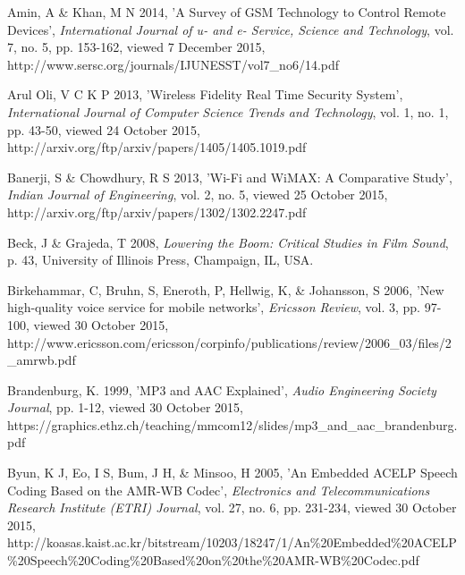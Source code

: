 \documentclass[12pt,svgnames,smaller]{article} %
\begin{document}
	\begin{thebibliography}{ 10 }
		
		
		Amin, A \& Khan, M N 2014, 'A Survey of GSM Technology to Control Remote Devices', \emph{International Journal of u- and e- Service, Science and Technology}, vol. 7, no. 5, pp. 153-162, viewed 7 December 2015, http://www.sersc.org/journals/IJUNESST/vol7\_no6/14.pdf
		
		
		Arul Oli, V C K P 2013, 'Wireless Fidelity Real Time Security System', \emph{International Journal of Computer Science Trends and Technology},	vol. 1, no. 1, pp. 43-50, viewed 24 October 2015, http://arxiv.org/ftp/arxiv/papers/1405/1405.1019.pdf
		
		
		Banerji, S \& Chowdhury, R S 2013, 'Wi-Fi and WiMAX: A Comparative Study', \emph{Indian Journal of Engineering}, vol. 2, no. 5, viewed 25 October 2015, http://arxiv.org/ftp/arxiv/papers/1302/1302.2247.pdf 
		
		
		Beck, J \& Grajeda, T 2008,
		\emph{Lowering the Boom: Critical Studies in Film Sound}, p. 43, University of Illinois Press, Champaign, IL, USA. 
		
		
		Birkehammar, C, Bruhn, S, Eneroth, P, Hellwig, K, \& Johansson, S 2006, 'New high-quality voice service for mobile networks', \emph{Ericsson Review}, vol. 3, pp. 97-100, viewed 30 October 2015, http://www.ericsson.com/ericsson/corpinfo/publications/review/2006\_03/files/2\_amrwb.pdf
		
		
		Brandenburg, K. 1999, 'MP3 and AAC Explained', \emph{Audio Engineering Society Journal}, pp. 1-12, viewed 30 October 2015, https://graphics.ethz.ch/teaching/mmcom12/slides/mp3\_and\_aac\_brandenburg.pdf
		
		
		Byun, K J, Eo, I S, Bum, J H, \& Minsoo, H 2005, 'An Embedded ACELP Speech Coding Based on the AMR-WB Codec', \emph{Electronics and Telecommunications Research Institute (ETRI) Journal}, vol. 27, no. 6, pp. 231-234, viewed 30 October 2015, http://koasas.kaist.ac.kr/bitstream/10203/18247/1/An\%20Embedded\%20ACELP\%20Speech\%20Coding\%20Based\%20on\%20the\%20AMR-WB\%20Codec.pdf
		

\end{thebibliography}
\end{document}

